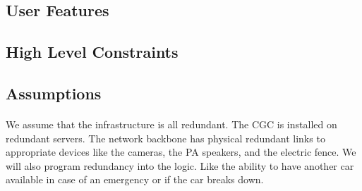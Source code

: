 \documentclass[12pt]{article}
\begin{document}
		\paragraph{} 
		
		\paragraph{} 
		
		\paragraph{} 

	\subsection{User Features}
		\paragraph{} 
		
		\paragraph{} 
		
		\paragraph{} 
	
	\subsection{High Level Constraints}
		\paragraph{}

	\subsection{Assumptions}
	\paragraph{} We assume that the infrastructure is all redundant. The CGC is 
	installed on redundant servers. The network backbone has physical redundant 
	links to appropriate devices like the cameras, the PA speakers, and the 
	electric fence. We will also	program redundancy into the logic. Like the 
	ability to have another car available in case of an emergency or if the car 
	breaks down.
		
\end{document}
